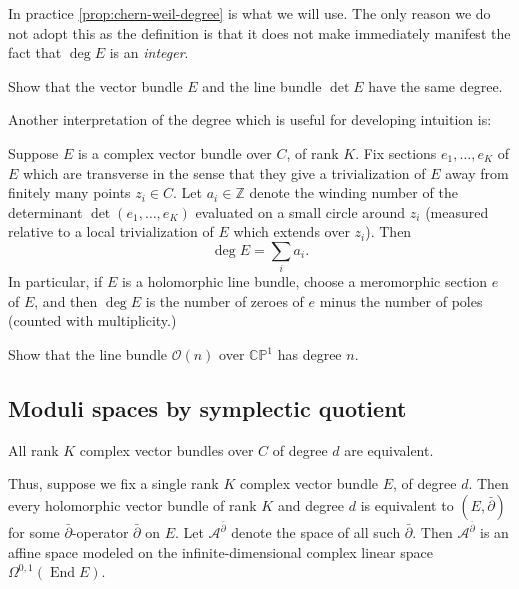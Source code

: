 \documentclass[12pt,letterpaper,reqno]{article}
\numberwithin{equation}{section}
\newcommand{\cO}{\ensuremath{\mathcal O}}
\newcommand{\cA}{\ensuremath{\mathcal A}}
\newcommand{\C}{\ensuremath{\mathbb C}}
\newcommand{\PP}{\ensuremath{\mathbb P}}
\newcommand{\Z}{\ensuremath{\mathbb Z}}
\newcommand{\ti}[1]{\textit{#1}}
\DeclareMathOperator{\End}{End}
\newcommand{\fixme}[1]{{\color{orange}{[#1]}}}
\begin{document}
In practice \autoref{prop:chern-weil-degree} is what we will use.
The only reason we do not adopt this as the definition is that
it does not make immediately manifest the fact that $\deg E$ is an 
\ti{integer}.

\begin{exercise} Show that the vector bundle $E$ and the line bundle $\det E$ 
have the same degree.
\end{exercise}

Another interpretation of the degree which is useful for developing 
intuition is:
\begin{prop} Suppose $E$ is a complex vector bundle over $C$, of rank $K$.
Fix sections $e_1, \dots, e_K$ of $E$ which are transverse in the sense
that they give a trivialization of $E$ away from finitely many points
$z_i \in C$. Let $a_i \in \Z$ denote the winding
number of the determinant $\det(e_1, \dots, e_K)$ evaluated 
on a small circle around $z_i$ (measured relative to a local trivialization
of $E$ which extends over $z_i$). Then
\begin{equation}
  \deg E = \sum_i a_i.
\end{equation}
In particular, if $E$ is a holomorphic line bundle, choose a meromorphic
section $e$ of $E$, and then $\deg E$ is the number of zeroes of $e$
minus the number of poles (counted with multiplicity.)
\end{prop}

\begin{exercise} Show that the line bundle $\cO(n)$ over $\C\PP^1$
has degree $n$.
\end{exercise}


\subsection{Moduli spaces by symplectic quotient}

\begin{prop}
All rank $K$ complex vector bundles over $C$ of degree $d$ are equivalent.
\end{prop}

\begin{pf} \fixme{...}
\end{pf}

Thus, suppose we fix a single rank $K$ complex vector bundle $E$, 
of degree $d$. Then every holomorphic vector bundle of rank $K$
and degree $d$ is equivalent to $(E, \bar\partial)$ for some
$\bar\partial$-operator $\bar\partial$ on $E$.
Let $\cA^{\bar\partial}$ denote the space of all such $\bar\partial$.
Then $\cA^{\bar\partial}$ is an affine space modeled on the 
infinite-dimensional complex linear space $\Omega^{0,1}(\End E)$.
\end{document}

